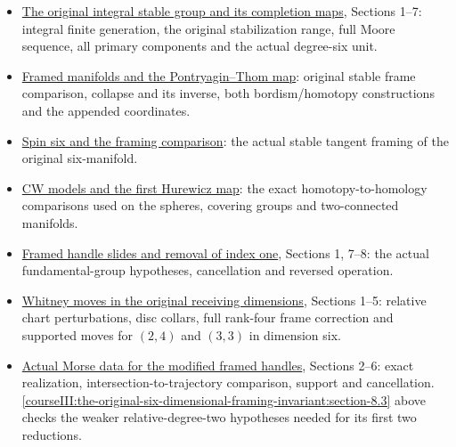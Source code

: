\begin{itemize}

\item
  \href{https://github.com/KokunoYumeto/open-math-courses/blob/4c3a90ea09a3258598e48b26cfb5f12ba69a0b05/docs/courses/CG-S6/src/the-original-integral-stable-group-and-its-completion-maps.md}{The original integral stable group and its completion maps}, Sections 1--7: integral finite generation, the original stabilization range, full Moore sequence, all primary components and the actual degree-six unit.
\item
  \href{https://github.com/KokunoYumeto/open-math-courses/blob/4c3a90ea09a3258598e48b26cfb5f12ba69a0b05/docs/courses/CG-S6/src/framed-manifolds-and-the-pontryagin-thom-map.md}{Framed manifolds and the Pontryagin--Thom map}: original stable frame comparison, collapse and its inverse, both bordism/homotopy constructions and the appended coordinates.
\item
  \href{https://github.com/KokunoYumeto/open-math-courses/blob/4c3a90ea09a3258598e48b26cfb5f12ba69a0b05/docs/courses/CG-S6/src/spin-six-and-the-framing-comparison.md}{Spin six and the framing comparison}: the actual stable tangent framing of the original six-manifold.
\item
  \href{https://github.com/KokunoYumeto/open-math-courses/blob/4c3a90ea09a3258598e48b26cfb5f12ba69a0b05/docs/courses/CG-S6/src/cw-models-and-the-first-hurewicz-map.md}{CW models and the first Hurewicz map}: the exact homotopy-to-homology comparisons used on the spheres, covering groups and two-connected manifolds.
\item
  \href{https://github.com/KokunoYumeto/open-math-courses/blob/4c3a90ea09a3258598e48b26cfb5f12ba69a0b05/docs/courses/CG-S6/src/framed-handle-slides-and-index-one-removal.md}{Framed handle slides and removal of index one}, Sections 1, 7--8: the actual fundamental-group hypotheses, cancellation and reversed operation.
\item
  \href{https://github.com/KokunoYumeto/open-math-courses/blob/4c3a90ea09a3258598e48b26cfb5f12ba69a0b05/docs/courses/CG-S6/src/whitney-moves-in-the-receiving-dimensions.md}{Whitney moves in the original receiving dimensions}, Sections 1--5: relative chart perturbations, disc collars, full rank-four frame correction and supported moves for \((2,4)\) and \((3,3)\) in dimension six.
\item
  \href{https://github.com/KokunoYumeto/open-math-courses/blob/4c3a90ea09a3258598e48b26cfb5f12ba69a0b05/docs/courses/CG-S6/src/realizing-framed-handles-and-middle-cancellation.md}{Actual Morse data for the modified framed handles}, Sections 2--6: exact realization, intersection-to-trajectory comparison, support and cancellation. \cref{courseIII:the-original-six-dimensional-framing-invariant:section-8.3} above checks the weaker relative-degree-two hypotheses needed for its first two reductions.
\end{itemize}


